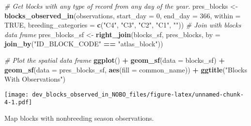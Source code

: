 \documentclass[
]{article}
\newenvironment{Shaded}{\begin{snugshade}}{\end{snugshade}}
\newcommand{\AttributeTok}[1]{\textcolor[rgb]{0.13,0.29,0.53}{#1}}
\newcommand{\CommentTok}[1]{\textcolor[rgb]{0.56,0.35,0.01}{\textit{#1}}}
\newcommand{\ConstantTok}[1]{\textcolor[rgb]{0.56,0.35,0.01}{#1}}
\newcommand{\DecValTok}[1]{\textcolor[rgb]{0.00,0.00,0.81}{#1}}
\newcommand{\FunctionTok}[1]{\textcolor[rgb]{0.13,0.29,0.53}{\textbf{#1}}}
\newcommand{\NormalTok}[1]{#1}
\newcommand{\OtherTok}[1]{\textcolor[rgb]{0.56,0.35,0.01}{#1}}
\newcommand{\SpecialCharTok}[1]{\textcolor[rgb]{0.81,0.36,0.00}{\textbf{#1}}}
\newcommand{\StringTok}[1]{\textcolor[rgb]{0.31,0.60,0.02}{#1}}
\begin{document}
\begin{Shaded}
\begin{Highlighting}[]
\CommentTok{\# Get blocks with any type of record from any day of the year.}
\NormalTok{pres\_blocks }\OtherTok{\textless{}{-}} \FunctionTok{blocks\_observed\_in}\NormalTok{(observations, }\AttributeTok{start\_day =} \DecValTok{0}\NormalTok{, }\AttributeTok{end\_day =} \DecValTok{366}\NormalTok{, }
                                  \AttributeTok{within =} \ConstantTok{TRUE}\NormalTok{,}
                                  \AttributeTok{breeding\_categories =} \FunctionTok{c}\NormalTok{(}\StringTok{"C4"}\NormalTok{, }\StringTok{"C3"}\NormalTok{, }\StringTok{"C2"}\NormalTok{, }
                                                          \StringTok{"C1"}\NormalTok{, }\StringTok{""}\NormalTok{))}
\CommentTok{\# Join with blocks data frame}
\NormalTok{pres\_blocks\_sf }\OtherTok{\textless{}{-}} \FunctionTok{right\_join}\NormalTok{(blocks\_sf, pres\_blocks, }\AttributeTok{by =} \FunctionTok{join\_by}\NormalTok{(}\StringTok{"ID\_BLOCK\_CODE"} \SpecialCharTok{==} \StringTok{"atlas\_block"}\NormalTok{))}

\CommentTok{\# Plot the spatial data frame}
\FunctionTok{ggplot}\NormalTok{() }\SpecialCharTok{+}
  \FunctionTok{geom\_sf}\NormalTok{(}\AttributeTok{data =}\NormalTok{ blocks\_sf) }\SpecialCharTok{+}
  \FunctionTok{geom\_sf}\NormalTok{(}\AttributeTok{data =}\NormalTok{ pres\_blocks\_sf, }\FunctionTok{aes}\NormalTok{(}\AttributeTok{fill =}\NormalTok{ common\_name)) }\SpecialCharTok{+}
  \FunctionTok{ggtitle}\NormalTok{(}\StringTok{"Blocks With Observations"}\NormalTok{)}
\end{Highlighting}
\end{Shaded}

\texttt{[image: dev\_blocks\_observed\_in\_NOBO\_files/figure-latex/unnamed-chunk-4-1.pdf]}

Map blocks with nonbreeding season observations.
\end{document}
